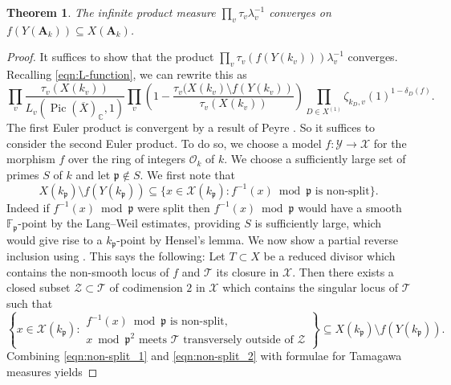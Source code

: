 \documentclass[a4paper,12pt,reqno]{amsart}
\numberwithin{equation}{section} \numberwithin{figure}{section}
\DeclareMathOperator{\Pic}{Pic} \DeclareMathOperator{\Div}{Div}
\renewcommand{\O}{\mathcal{O}}
\newcommand\F{\mathbb{F}}
\newcommand{\Adele}{\mathbf{A}}
\newcommand\CC{\mathbb{C}}
\renewcommand{\#}{\sharp}
\newcommand{\fp}{\mathfrak{p}}
\newtheorem{theorem}[lemma]{Theorem}
\theoremstyle{definition}
\numberwithin{lemma}{section}
\begin{document}
\begin{theorem} \label{thm:Tamagawa_product}
	The infinite product measure $\prod_v \tau_v \lambda_v^{-1}$
	converges on $f(Y(\Adele_k)) \subseteq X(\Adele_k)$. 
\end{theorem}
\begin{proof}
	It suffices to show that the product
	$\prod_v \tau_v(f(Y(k_v)))\lambda_v^{-1}$
	converges. Recalling \eqref{eqn:L-function}, we can rewrite this as
	$$\prod_v \frac{\tau_v(X(k_v))}{L_v(\Pic(\overline{X})_{\CC},1)}
	 \prod_v \left(1 - \frac{\tau_v(X(k_v) \setminus f(Y(k_v))}{\tau_v(X(k_v))} \right)
	 \prod_{D \in X^{(1)}} \zeta_{k_D,v}(1)^{1-\delta_D(f)}.$$	
	The first Euler product is convergent by a result of Peyre \cite[Prop.~2.2.2]{Pey95}.
	So it suffices to consider the second Euler product.
	To do so, we choose a model $f: \mathcal{Y} \to \mathcal{X}$ 
	for the morphism $f$ over the ring of integers $\O_k$ of $k$. 
	We choose a sufficiently large set of primes $S$ of $k$ and let
	$\fp \notin S$. We first note that 
	\begin{equation} \label{eqn:non-split_1}
		X(k_\fp) \setminus f(Y(k_\fp)) \subseteq \{ x \in \mathcal{X}(k_\fp) : 
		f^{-1}(x) \bmod \fp \text{ is non-split} \}.
	\end{equation}
	Indeed if $f^{-1}(x) \bmod \fp$ were split then $f^{-1}(x) \bmod \fp$ would have 
	a smooth $\F_\fp$-point by the Lang--Weil estimates, providing $S$ is sufficiently
	large, which would give rise to a $k_\fp$-point by Hensel's lemma. We now show
	a partial reverse inclusion using \cite[Thm~2.8]{LS16}.
	This says the following: Let $T \subset X$ be a reduced divisor which contains
	the non-smooth locus of $f$ and $\mathcal{T}$ its closure in $\mathcal{X}$. Then
	there exists a closed subset $\mathcal{Z} \subset \mathcal{T}$ of codimension $2$ in 
	$\mathcal{X}$ which contains	the singular locus of $\mathcal{T}$ such that
	\begin{equation} \label{eqn:non-split_2}
		\left\{ x \in \mathcal{X}(k_\fp) : 
		\begin{array}{l}
			f^{-1}(x) \bmod \fp \text{ is non-split},  \\
			x \bmod \fp^2  \text{ meets } \mathcal{T} \text{ transversely 
			outside of } \mathcal{Z}
		\end{array} \right\} \subseteq X(k_\fp) \setminus f(Y(k_\fp)).
	\end{equation}
	Combining \eqref{eqn:non-split_1} and \eqref{eqn:non-split_2}
	with  formulae for Tamagawa measures \cite[Lem.~3.2]{BL19} yields

\end{proof}
\end{document}
